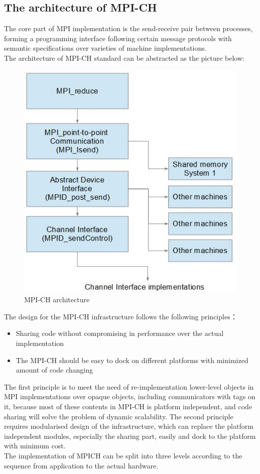 \documentclass[11pt,openright,a4paper]{report}
\begin{document}
\subsection{The architecture of MPI-CH}
The core part of MPI implementation is the send-receive pair between processes, forming a programming interface following certain message protocols with semantic specifications over varieties of machine implementations.\\
The architecture of MPI-CH standard can be abstracted as the picture below:
\begin{figure}[H]
\centering
\includegraphics[width=0.6\linewidth]{picture/MPIarchitecture}
\caption{MPI-CH architecture}
\label{fig:MPIarchitecture}
\end{figure}
The design for the MPI-CH infrastructure follows the following principles\cite{gropp1996high}：
\begin{itemize}
	\item Sharing code without compromising in performance over the actual implementation
	\item The MPI-CH should be easy to dock on different platforms with minimized amount of code changing
\end{itemize}
The first principle is to meet the need of re-implementation lower-level objects in MPI implementations over opaque objects, including communicators with tags on it, because most of these contents in MPI-CH is platform independent, and code sharing will solve the problem of dynamic scalability. The second principle requires modularised design of the infrastructure, which can replace the platform independent modules, especially the sharing part, easily and dock to the platform with minimum cost.\\
The implementation of MPICH can be split into three levels according to the sequence from application to the actual hardware.\\
\end{document}
